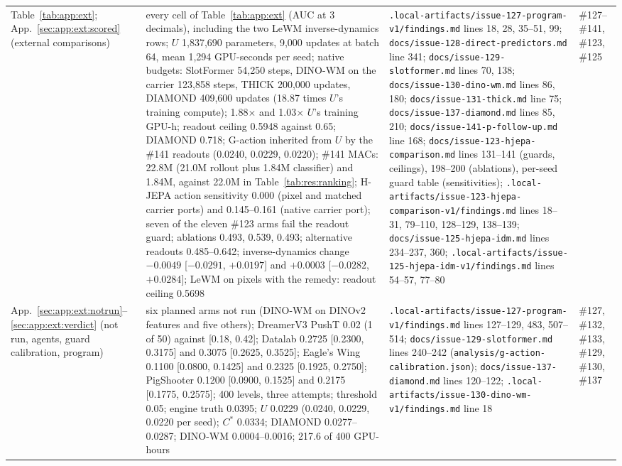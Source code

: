 {\begin{revblock}
\begin{longtable}{@{}>{\raggedright\arraybackslash}p{}>{\raggedright\arraybackslash}p{}>{\raggedright\arraybackslash}p{}>{\raggedright\arraybackslash}p{}@{}}
Table~\ref{tab:app:ext}; App.~\ref{sec:app:ext:scored} (external comparisons) & every cell of Table~\ref{tab:app:ext} (AUC at 3 decimals), including the two LeWM inverse-dynamics rows; $U$ 1,837,690 parameters, 9,000 updates at batch 64, mean 1,294 GPU-seconds per seed; native budgets: SlotFormer 54,250 steps, DINO-WM on the carrier 123,858 steps, THICK 200,000 updates, DIAMOND 409,600 updates (18.87 times $U$'s training compute); 1.88$\times$ and 1.03$\times$ $U$'s training GPU-h; readout ceiling 0.5948 against 0.65; DIAMOND 0.718; G-action inherited from $U$ by the \#141 readouts (0.0240, 0.0229, 0.0220); \#141 MACs: 22.8M (21.0M rollout plus 1.84M classifier) and 1.84M, against 22.0M in Table~\ref{tab:res:ranking}; H-JEPA action sensitivity 0.000 (pixel and matched carrier ports) and 0.145--0.161 (native carrier port); seven of the eleven \#123 arms fail the readout guard; ablations 0.493, 0.539, 0.493; alternative readouts 0.485--0.642; inverse-dynamics change $-0.0049$ [$-0.0291$, $+0.0197$] and $+0.0003$ [$-0.0282$, $+0.0284$]; LeWM on pixels with the remedy: readout ceiling 0.5698 & \nolinkurl{.local-artifacts/issue-127-program-v1/findings.md} lines 18, 28, 35--51, 99; \nolinkurl{docs/issue-128-direct-predictors.md} line 341; \nolinkurl{docs/issue-129-slotformer.md} lines 70, 138; \nolinkurl{docs/issue-130-dino-wm.md} lines 86, 180; \nolinkurl{docs/issue-131-thick.md} line 75; \nolinkurl{docs/issue-137-diamond.md} lines 85, 210; \nolinkurl{docs/issue-141-p-follow-up.md} line 168; \nolinkurl{docs/issue-123-hjepa-comparison.md} lines 131--141 (guards, ceilings), 198--200 (ablations), per-seed guard table (sensitivities); \nolinkurl{.local-artifacts/issue-123-hjepa-comparison-v1/findings.md} lines 18--31, 79--110, 128--129, 138--139; \nolinkurl{docs/issue-125-hjepa-idm.md} lines 234--237, 360; \nolinkurl{.local-artifacts/issue-125-hjepa-idm-v1/findings.md} lines 54--57, 77--80 & \#127--\allowbreak\#141, \#123, \#125 \\
App.~\ref{sec:app:ext:notrun}--\ref{sec:app:ext:verdict} (not run, agents, guard calibration, program) & six planned arms not run (DINO-WM on DINOv2 features and five others); DreamerV3 PushT 0.02 (1 of 50) against [0.18, 0.42]; Datalab 0.2725 [0.2300, 0.3175] and 0.3075 [0.2625, 0.3525]; Eagle's Wing 0.1100 [0.0800, 0.1425] and 0.2325 [0.1925, 0.2750]; PigShooter 0.1200 [0.0900, 0.1525] and 0.2175 [0.1775, 0.2575]; 400 levels, three attempts; threshold 0.05; engine truth 0.0395; $U$ 0.0229 (0.0240, 0.0229, 0.0220 per seed); $C^{*}$ 0.0334; DIAMOND 0.0277--0.0287; DINO-WM 0.0004--0.0016; 217.6 of 400 GPU-hours & \nolinkurl{.local-artifacts/issue-127-program-v1/findings.md} lines 127--129, 483, 507--514; \nolinkurl{docs/issue-129-slotformer.md} lines 240--242 (\nolinkurl{analysis/g-action-calibration.json}); \nolinkurl{docs/issue-137-diamond.md} lines 120--122; \nolinkurl{.local-artifacts/issue-130-dino-wm-v1/findings.md} line 18 & \#127, \#132, \#133, \#129, \#130, \#137 \\

\end{longtable}
\end{revblock}}

